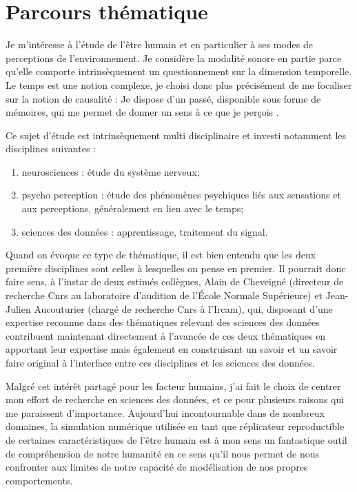\chapter{\nmu Parcours  thématique} \label{chap:themes}

  Je m'intéresse à l'étude de l'être humain et en particulier à ses modes de perceptions de l'environnement. Je considère la modalité sonore en partie parce qu'elle comporte intrinsèquement un questionnement sur la dimension temporelle. Le temps est une notion complexe, je choisi donc plus précisément de me focaliser sur la notion de causalité : \og Je dispose d'un passé, disponible sous forme de mémoires, qui me permet de donner un sens à ce que je perçois \fg.

  Ce sujet d'étude est intrinsèquement multi disciplinaire et investi notamment les disciplines suivantes :
  \begin{enumerate}
    \item neurosciences : étude du système nerveux;
    \item psycho perception : étude des phénomènes psychiques liés aux sensations et aux perceptions, généralement en lien avec le temps;
    \item sciences des données : apprentissage, traitement du signal.
  \end{enumerate}

  Quand on évoque ce type de thématique, il est bien entendu que les deux première disciplines sont  celles à lesquelles on pense en premier. Il pourrait donc faire sens, à l'instar de deux estimés collègues, Alain de Cheveigné (directeur de recherche Cnrs au laboratoire d'audition de l'\'Ecole Normale Supérieure) et Jean-Julien Aucouturier (chargé de recherche Cnrs à l'Ircam), qui, disposant d'une expertise reconnue dans des thématiques relevant des sciences des données contribuent maintenant directement à l'avancée de ces deux thématiques en apportant leur expertise mais également en construisant un savoir et un savoir faire original à l'interface entre ces disciplines et les sciences des données.

  Malgré cet intérêt partagé pour les facteur humains, j'ai fait le choix de centrer mon effort de recherche en sciences des données, et ce pour plusieurs raisons qui me paraissent d'importance. Aujourd'hui incontournable dans de nombreux domaines, la simulation numérique utilisée en tant que \og réplicateur reproductible \fg de certaines caractéristiques de l'être humain est à mon sens un fantastique outil de compréhension de notre humanité en ce sens qu'il nous permet de nous confronter aux limites de notre capacité de modélisation de nos propres comportements.

